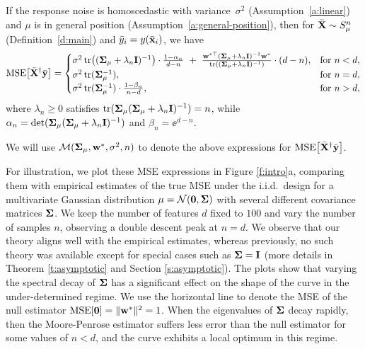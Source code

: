 \documentclass[11pt]{article}
\begin{document}
\begin{theorem}
\label{t:mse}
  If the response noise is homoscedastic with variance~$\sigma^2$
  (Assumption~\ref{a:linear}) and $\mu$ is in
  general position (Assumption~\ref{a:general-position}), then for
  ${\bar{\mathbf X}}\sim S_\mu^n$ (Definition~\ref{d:main}) and
  ${\bar y}_i=y(\bar{\mathbf x}_i)$, we have
  \begin{align*}
    \MSE{\Xb^\dagger\ybb} =
    \begin{cases}
    \sigma^2\,\tr\big((\Sigmab_\mu+\lambda_n\I)^{-1}\big)\cdot
    \frac{1-\alpha_n}{d-n}\ +\
\frac{\w^{*\top}(\Sigmab_\mu+\lambda_n\I)^{-1}\w^*}
{\tr((\Sigmab_\mu+\lambda_n\I)^{-1})}\cdot (d-n),
&\text{for }n<d,\\
\sigma^2\, \tr(\Sigmab_\mu^{-1}),& \text{for }n=d,\\
\sigma^2\,\tr(\Sigmab_\mu^{-1})\cdot\frac{1-\beta_n}{n-d},&\text{for
}n>d,
\end{cases}
  \end{align*}
  where $\lambda_n\geq 0$ satisfies
  $\mathrm{tr}(\mathbf{\Sigma}_\mu (\mathbf{\Sigma}_\mu+\lambda_n\mathbf I)^{-1})=n$, while
  $\alpha_n=\det(\mathbf{\Sigma}_\mu(\mathbf{\Sigma}_\mu+\lambda_n\mathbf I)^{-1})$
  and $\beta_n=\ee^{d-n}$.
\end{theorem}
\begin{definition}
  We will use $\mathcal M(\mathbf{\Sigma}_\mu, \mathbf w^*,\sigma^2,n)$ to denote the above expressions
  for ${\mathrm{MSE}\big[{\bar{\mathbf X}}^\dagger\bar{\mathbf y}\big]}$.
\end{definition}
For illustration, we plot these MSE expressions in Figure \ref{f:intro}a,
comparing them with empirical estimates of the true MSE under the
i.i.d.~design for a multivariate Gaussian distribution
$\mu=\mathcal{N}(\mathbf 0,\mathbf{\Sigma})$ with several different covariance matrices $\mathbf{\Sigma}$. We keep the number of features $d$ fixed to
$100$ and vary the number of samples $n$, observing a double descent
peak at $n=d$. We observe that our theory aligns well with
the empirical estimates, whereas
previously, no such theory was available except for special
cases such as $\mathbf{\Sigma}=\mathbf I$ (more details in Theorem \ref{t:asymptotic}
and Section \ref{s:asymptotic}). The plots
show that varying the spectral decay of $\mathbf{\Sigma}$ has a significant effect on the
shape of the curve in the under-determined regime. We use the
horizontal line to denote the MSE of the null estimator
$\mathrm{MSE}[\mathbf 0]=\|\mathbf w^*\|^2=1$. When the eigenvalues of $\mathbf{\Sigma}$
decay rapidly, then the Moore-Penrose estimator suffers less error 
than the null estimator for some values of $n<d$, and the curve
exhibits a local optimum in this regime.
\end{document}
